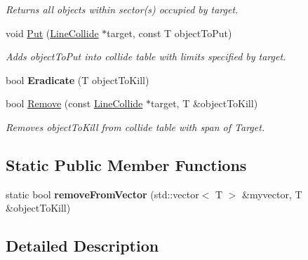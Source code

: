 \begin{DoxyCompactItemize}
\begin{DoxyCompactList}\small\item\em Returns all objects within sector(s) occupied by target. \end{DoxyCompactList}\item 
void \hyperlink{classHashtable3d_acdc68907a47773a5ad3c13966d6cb702}{Put} (\hyperlink{structLineCollide}{Line\+Collide} $\ast$target, const T object\+To\+Put)\hypertarget{classHashtable3d_acdc68907a47773a5ad3c13966d6cb702}{}\label{classHashtable3d_acdc68907a47773a5ad3c13966d6cb702}

\begin{DoxyCompactList}\small\item\em Adds object\+To\+Put into collide table with limits specified by target. \end{DoxyCompactList}\item 
bool {\bfseries Eradicate} (T object\+To\+Kill)\hypertarget{classHashtable3d_a21859ec474cdd387de255fb152483e3e}{}\label{classHashtable3d_a21859ec474cdd387de255fb152483e3e}

\item 
bool \hyperlink{classHashtable3d_ab8ff713443c1a592d6df0514870ad155}{Remove} (const \hyperlink{structLineCollide}{Line\+Collide} $\ast$target, T \&object\+To\+Kill)\hypertarget{classHashtable3d_ab8ff713443c1a592d6df0514870ad155}{}\label{classHashtable3d_ab8ff713443c1a592d6df0514870ad155}

\begin{DoxyCompactList}\small\item\em Removes object\+To\+Kill from collide table with span of Target. \end{DoxyCompactList}\end{DoxyCompactItemize}
\subsection*{Static Public Member Functions}
\begin{DoxyCompactItemize}
\item 
static bool {\bfseries remove\+From\+Vector} (std\+::vector$<$ T $>$ \&myvector, T \&object\+To\+Kill)\hypertarget{classHashtable3d_acd756153bb7496562d1c0958d61e8c56}{}\label{classHashtable3d_acd756153bb7496562d1c0958d61e8c56}

\end{DoxyCompactItemize}


\subsection{Detailed Description}
